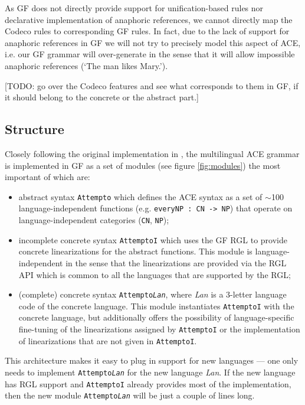 \documentclass[a4paper]{article}
\begin{document}
As GF does not directly provide support for unification-based rules nor
declarative implementation of anaphoric references, we cannot directly map
the Codeco rules to corresponding GF rules.
In fact, due to the lack of support for
anaphoric references in GF we will not try to precisely model this aspect of
ACE, i.e. our GF grammar will over-generate in the sense that it will allow
impossible anaphoric references (`The man likes Mary.').

[TODO: go over the Codeco features and see what corresponds to them
in GF, if it should belong to the concrete or the abstract part.]

\subsection{Structure}

Closely following the original implementation in \cite{ranta:cnl2009_revised},
the multilingual ACE grammar is implemented in GF as a set of modules
(see figure \ref{fig:modules}) the most important of which are:

\begin{itemize}
\item abstract syntax \texttt{Attempto} which defines the ACE syntax as
a set of $\sim$100 language-independent functions
(e.g. \verb!everyNP : CN -> NP!)
that operate on language-independent categories (\texttt{CN}, \texttt{NP});
\item incomplete concrete syntax \texttt{AttemptoI} which uses the GF RGL
to provide concrete linearizations for the abstract functions. This module
is language-independent in the sense that the linearizations are provided
via the RGL API which is common to all the languages that are supported by the
RGL;
\item (complete) concrete syntax \texttt{Attempto\textit{Lan}}, where
\textit{Lan} is a 3-letter language code of the concrete language. This
module instantiates \texttt{AttemptoI} with the concrete language, but
additionally offers the possibility of language-specific fine-tuning of the
linearizations assigned by \texttt{AttemptoI} or the implementation of
linearizations that are not given in \texttt{AttemptoI}.
\end{itemize}

This architecture makes it easy to plug in support for new languages ---
one only needs to implement \texttt{Attempto\textit{Lan}} for the new language
\textit{Lan}. If the new language has RGL support and \texttt{AttemptoI}
already provides most of the implementation, then
the new module \texttt{Attempto\textit{Lan}} will be just a couple of lines
long.
\end{document}
